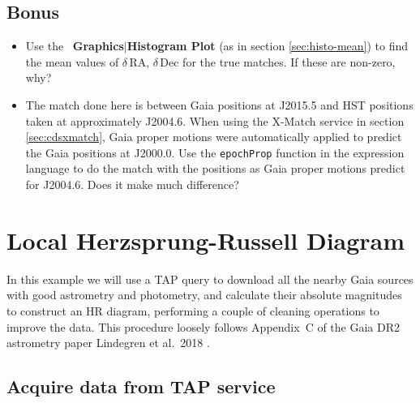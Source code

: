 \documentclass{article}
\newcommand{\buttimg}[1]
           {\mbox{\vtop{\vskip-2ex\hbox{\texttt{[image: \#1]}}}}}
\newcommand{\winfig}[2]
           {\vspace*{-0.5cm}
            \hspace*{0.5cm}\mbox{\vtop{\hbox{\texttt{[image: \#2]}}}}}
\newcommand{\lab}[1]{{\bf #1}}
\newcommand{\mb}[3]{\buttimg{#1}~\lab{#2}$\mid$\lab{#3}}
\begin{document}
\begin{minipage}[t]{11cm}
  \subsection*{Bonus}

  \begin{itemize}
  \item Use the \mb{histo_button.png}{Graphics}{Histogram Plot}
        (as in section \ref{sec:histo-mean})
        to find the mean values of $\delta$\,RA, $\delta$\,Dec for
        the true matches.
        If these are non-zero, why?
  \item The match done here is between Gaia positions at J2015.5 and
        HST positions taken at approximately J2004.6.
        When using the X-Match service in section \ref{sec:cdsxmatch},
        Gaia proper motions were automatically applied
        to predict the Gaia positions at J2000.0.
        Use the {\tt epochProp} function in the expression language
        to do the match with the positions as Gaia proper motions
        predict for J2004.6.  Does it make much difference?
  \end{itemize}
\end{minipage}
\begin{minipage}[t]{8cm}
  \winfig{width=8cm}{n3_skyboth.png}
  \vspace*{1cm}

  \winfig{width=8cm}{n3_pairmatch.png}
\end{minipage}


\newpage
\section{Local Herzsprung-Russell Diagram}
\label{sec:hrd}

In this example we will use a TAP query to download
all the nearby Gaia sources with good astrometry and photometry,
and calculate their absolute magnitudes to construct an HR diagram,
performing a couple of cleaning operations to improve the data.
This procedure loosely follows
Appendix~C of the Gaia DR2 astrometry paper
Lindegren et al.\ 2018 \cite{lindegren}.

\subsection{Acquire data from TAP service}
\label{sec:hrd-tap}
\end{document}
